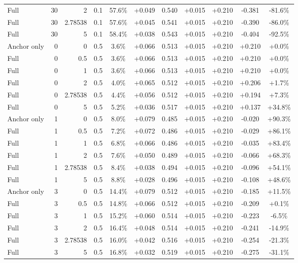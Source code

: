 \begin{table}[htbp]
\begin{tabular}{lrrrccccccc}
Full & 30 & 2 & 0.1 & 57.6\% & +0.049 & 0.540 & +0.015 & +0.210 & -0.381 & -81.6\% \\
Full & 30 & 2.78538 & 0.1 & 57.6\% & +0.045 & 0.541 & +0.015 & +0.210 & -0.390 & -86.0\% \\
Full & 30 & 5 & 0.1 & 58.4\% & +0.038 & 0.543 & +0.015 & +0.210 & -0.404 & -92.5\% \\
Anchor only & 0 & 0 & 0.5 & 3.6\% & +0.066 & 0.513 & +0.015 & +0.210 & +0.210 & +0.0\% \\
Full & 0 & 0.5 & 0.5 & 3.6\% & +0.066 & 0.513 & +0.015 & +0.210 & +0.210 & +0.0\% \\
Full & 0 & 1 & 0.5 & 3.6\% & +0.066 & 0.513 & +0.015 & +0.210 & +0.210 & +0.0\% \\
Full & 0 & 2 & 0.5 & 4.0\% & +0.065 & 0.512 & +0.015 & +0.210 & +0.206 & +1.7\% \\
Full & 0 & 2.78538 & 0.5 & 4.4\% & +0.056 & 0.512 & +0.015 & +0.210 & +0.194 & +7.3\% \\
Full & 0 & 5 & 0.5 & 5.2\% & +0.036 & 0.517 & +0.015 & +0.210 & +0.137 & +34.8\% \\
Anchor only & 1 & 0 & 0.5 & 8.0\% & +0.079 & 0.485 & +0.015 & +0.210 & -0.020 & +90.3\% \\
Full & 1 & 0.5 & 0.5 & 7.2\% & +0.072 & 0.486 & +0.015 & +0.210 & -0.029 & +86.1\% \\
Full & 1 & 1 & 0.5 & 6.8\% & +0.066 & 0.486 & +0.015 & +0.210 & -0.035 & +83.4\% \\
Full & 1 & 2 & 0.5 & 7.6\% & +0.050 & 0.489 & +0.015 & +0.210 & -0.066 & +68.3\% \\
Full & 1 & 2.78538 & 0.5 & 8.4\% & +0.038 & 0.494 & +0.015 & +0.210 & -0.096 & +54.1\% \\
Full & 1 & 5 & 0.5 & 8.8\% & +0.028 & 0.496 & +0.015 & +0.210 & -0.108 & +48.6\% \\
Anchor only & 3 & 0 & 0.5 & 14.4\% & +0.079 & 0.512 & +0.015 & +0.210 & -0.185 & +11.5\% \\
Full & 3 & 0.5 & 0.5 & 14.8\% & +0.066 & 0.512 & +0.015 & +0.210 & -0.209 & +0.1\% \\
Full & 3 & 1 & 0.5 & 15.2\% & +0.060 & 0.514 & +0.015 & +0.210 & -0.223 & -6.5\% \\
Full & 3 & 2 & 0.5 & 16.4\% & +0.048 & 0.514 & +0.015 & +0.210 & -0.241 & -14.9\% \\
Full & 3 & 2.78538 & 0.5 & 16.0\% & +0.042 & 0.516 & +0.015 & +0.210 & -0.254 & -21.3\% \\
Full & 3 & 5 & 0.5 & 16.8\% & +0.032 & 0.519 & +0.015 & +0.210 & -0.275 & -31.1\% \\

\end{tabular}
\end{table}
